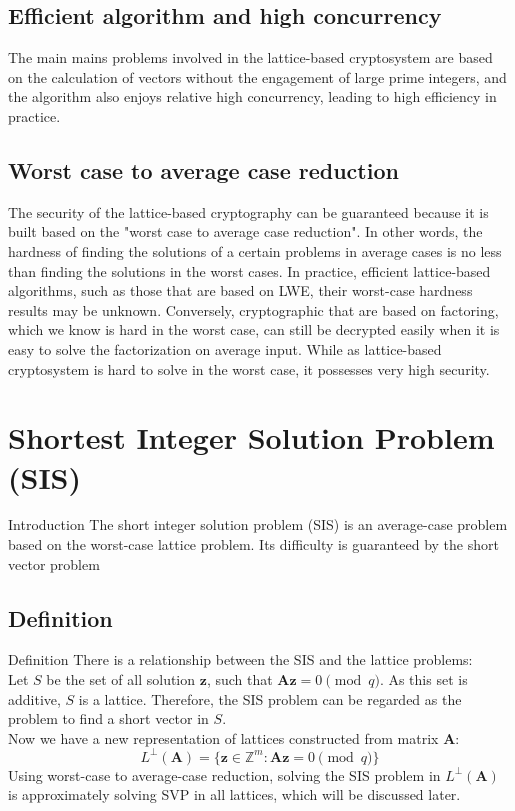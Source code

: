 \documentclass{beamer}
\begin{document}
	\subsection{Efficient algorithm and high concurrency} 
	\begin{frame}
		The main mains problems involved in the lattice-based cryptosystem are based on the calculation of vectors without the engagement of large prime integers, and the algorithm also enjoys relative high concurrency, leading to high efficiency in practice.
	\end{frame}
	\subsection{Worst case to average case reduction}
	\begin{frame}
		The security of the lattice-based cryptography can be guaranteed because it is built based on the "worst case to average case reduction". In other words, the hardness of finding the solutions of a certain problems in average cases is no less than finding the solutions in the worst cases. In practice, efficient lattice-based algorithms, such as those that are based on LWE, their worst-case hardness results may be unknown. Conversely, cryptographic that are based on factoring, which we know is hard in the worst case, can still be decrypted easily when it is easy to solve the factorization on average input. While as lattice-based cryptosystem is hard to solve in the worst case, it possesses very high security.
	\end{frame}
	\section{Shortest Integer Solution Problem (SIS)}
	\begin{frame}{Introduction}
		The short integer solution problem (SIS) is an average-case problem based on the worst-case lattice problem. Its difficulty is guaranteed by the short vector problem
	\end{frame}
	\subsection{Definition}
	\begin{frame}{Definition}
		There is a relationship between the SIS and the lattice problems:\\
		Let $S$ be the set of all solution $\mathbf{z}$, such that $\mathbf{A}\mathbf{z}=0\pmod{q}$. As this set is additive, $S$ is a lattice. Therefore, the SIS problem can be regarded as the problem to find a short vector in $S$.\\
		Now we have a new representation of lattices constructed from matrix $\mathbf{A}$:
		\begin{equation}
			L^{\perp}(\mathbf{A})=\{\mathbf{z}\in\mathbb{Z}^m: \mathbf{A}\mathbf{z}=0 \pmod{q}\}
		\end{equation}
		Using worst-case to average-case reduction, solving the SIS problem in $L^{\perp}(\mathbf{A})$ is approximately solving SVP in all lattices, which will be discussed later.
	\end{frame}
\end{document}
